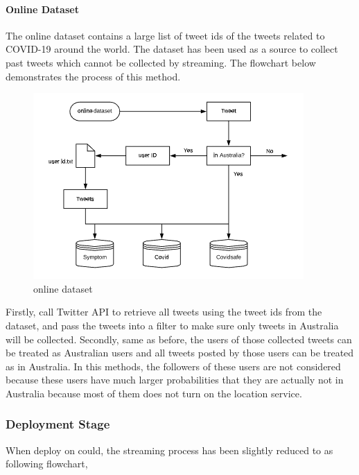\paragraph{Online Dataset}

The online dataset contains a large list of tweet ids of the tweets related to COVID-19 around the world. The dataset has been used as a source to collect past tweets which cannot be collected by streaming. The flowchart below demonstrates the process of this method.
\begin{figure}[H]
\centering
\includegraphics[scale=0.7]{city_analytics/report/images/online.png}
\caption{online dataset}
\label{fig:stream}
\end{figure}

Firstly, call Twitter API to retrieve all tweets using the tweet ids from the dataset, and pass the tweets into a filter to make sure only tweets in Australia will be collected. Secondly, same as before, the users of those collected tweets can be treated as Australian users and all tweets posted by those users can be treated as in Australia. In this methods, the followers of these users are not considered because these users have much larger probabilities that they are actually not in Australia because most of them does not turn on the location service.
\subsubsection{Deployment Stage}
When deploy on could, the streaming process has been slightly reduced to as following flowchart,

